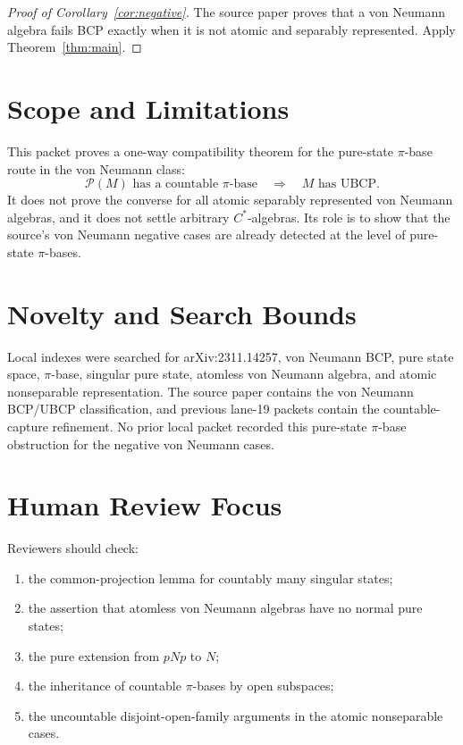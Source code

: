 \documentclass[11pt]{article}
\newcommand{\Pcal}{\mathcal P}
\begin{document}
\begin{proof}[Proof of Corollary~\ref{cor:negative}]
The source paper proves that a von Neumann algebra fails BCP exactly when it
is not atomic and separably represented.  Apply Theorem~\ref{thm:main}.
\end{proof}

\section*{Scope and Limitations}

This packet proves a one-way compatibility theorem for the pure-state
\(\pi\)-base route in the von Neumann class:
\[
        \Pcal(M)\text{ has a countable }\pi\text{-base}
        \quad\Longrightarrow\quad
        M\text{ has UBCP}.
\]
It does not prove the converse for all atomic separably represented von
Neumann algebras, and it does not settle arbitrary \(C^*\)-algebras.  Its
role is to show that the source's von Neumann negative cases are already
detected at the level of pure-state \(\pi\)-bases.

\section*{Novelty and Search Bounds}

Local indexes were searched for arXiv:2311.14257, von Neumann BCP, pure
state space, \(\pi\)-base, singular pure state, atomless von Neumann algebra,
and atomic nonseparable representation.  The source paper contains the von
Neumann BCP/UBCP classification, and previous lane-19 packets contain the
countable-capture refinement.  No prior local packet recorded this
pure-state \(\pi\)-base obstruction for the negative von Neumann cases.

\section*{Human Review Focus}

Reviewers should check:
\begin{enumerate}
    \item the common-projection lemma for countably many singular states;
    \item the assertion that atomless von Neumann algebras have no normal pure
          states;
    \item the pure extension from \(pNp\) to \(N\);
    \item the inheritance of countable \(\pi\)-bases by open subspaces;
    \item the uncountable disjoint-open-family arguments in the atomic
          nonseparable cases.
\end{enumerate}
\end{document}

